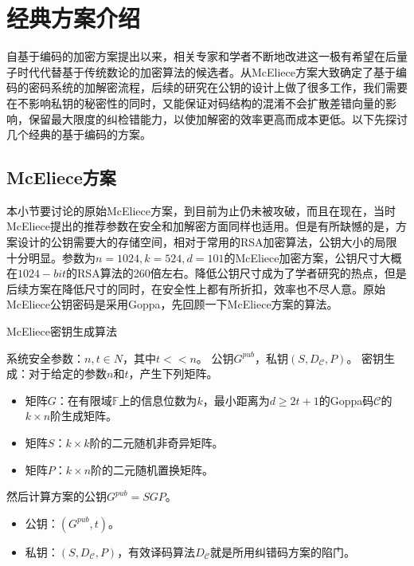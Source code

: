 \chapter{经典方案介绍}
\vspace{-0.2cm}
自基于编码的加密方案提出以来，相关专家和学者不断地改进这一极有希望在后量子时代代替基于传统数论的加密算法的候选者。从McEliece方案大致确定了基于编码的密码系统的加解密流程，后续的研究在公钥的设计上做了很多工作，我们需要在不影响私钥的秘密性的同时，又能保证对码结构的混淆不会扩散差错向量的影响，保留最大限度的纠检错能力，以使加解密的效率更高而成本更低。以下先探讨几个经典的基于编码的方案。
\section{McEliece方案}
本小节要讨论的原始McEliece方案，到目前为止仍未被攻破，而且在现在，当时McEliece提出的推荐参数在安全和加解密方面同样也适用。但是有所缺憾的是，方案设计的公钥需要大的存储空间，相对于常用的RSA加密算法，公钥大小的局限十分明显。参数为$n=1024,k=524,d=101$的McEliece加密方案，公钥尺寸大概在$1024-bit$的RSA算法的260倍左右。降低公钥尺寸成为了学者研究的热点，但是后续方案在降低尺寸的同时，在安全性上都有所折扣，效率也不尽人意。原始McEliece公钥密码是采用Goppa，先回顾一下McEliece方案的算法。

\begin{breakablealgorithm}
	\small
	\renewcommand{\algorithmicrequire}{\textbf{Input:}}
	\renewcommand{\algorithmicensure}{\textbf{Output:}}
	\caption{McEliece密钥生成算法}
	\label{alg:McElieceKeyGen}
	\begin{algorithmic}[1]		
		\Require
		系统安全参数：$n,t \in N$，其中$t << n$。
		\Ensure
		公钥$G^{pub}$，私钥$(S,D_\mathcal{C},P)$。
		\State
		密钥生成：对于给定的参数$n$和$t$，产生下列矩阵。
		\begin{itemize}
			\item 矩阵$G$：在有限域$\mathbb{F}$上的信息位数为$k$，最小距离为$d \geq 2t + 1$的Goppa码$\mathcal{C}$的$k \times n$阶生成矩阵。
			\item 矩阵$S$：$k \times k$阶的二元随机非奇异矩阵。
			\item 矩阵$P$：$k \times n$阶的二元随机置换矩阵。
		\end{itemize}	    
		\State
		然后计算方案的公钥$G^{pub} = SGP$。
		\begin{itemize}
			\item 公钥：$(G^{pub},t)$。
			\item 私钥：$(S,D_\mathcal{C},P)$，有效译码算法$D_\mathcal{C}$就是所用纠错码方案的陷门。
		\end{itemize}
	\end{algorithmic}
\end{breakablealgorithm}

